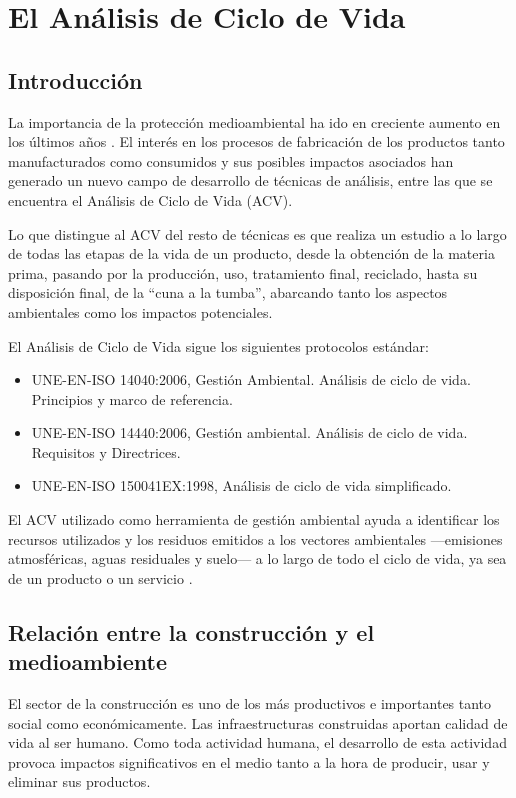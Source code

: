 \chapter{El Análisis de Ciclo de Vida}
\section{Introducción}
La importancia de la protección medioambiental ha ido en creciente aumento en los últimos años \cite{iso14040}. El interés en los procesos de fabricación de los productos tanto manufacturados como consumidos y sus posibles impactos asociados han generado un nuevo campo de desarrollo de técnicas de análisis, entre las que se encuentra el Análisis de Ciclo de Vida (ACV).

Lo que distingue al ACV del resto de técnicas es que realiza un estudio a lo largo de todas las etapas de la vida de un producto, desde la obtención de la materia prima, pasando por la producción, uso, tratamiento final, reciclado, hasta su disposición final, de la ``cuna a la tumba'', abarcando tanto los aspectos ambientales como los impactos potenciales.

El Análisis de Ciclo de Vida sigue los siguientes protocolos estándar:
\begin{itemize}
\item UNE-EN-ISO 14040:2006, Gestión Ambiental. Análisis de ciclo de vida. Principios y marco de referencia.
\item UNE-EN-ISO 14440:2006, Gestión ambiental. Análisis de ciclo de vida. Requisitos y Directrices.
\item UNE-EN-ISO 150041EX:1998, Análisis de ciclo de vida simplificado.
\end{itemize}

El ACV utilizado como herramienta de gestión ambiental ayuda a identificar los recursos utilizados y los residuos emitidos a los vectores ambientales —emisiones atmosféricas, aguas residuales y suelo— a lo largo de todo el ciclo de vida, ya sea de un producto o un servicio \cite{iso14440}.

\section{Relación entre la construcción y el medioambiente}
El sector de la construcción es uno de los más productivos e importantes tanto social como económicamente. Las infraestructuras construidas aportan calidad de vida al ser humano. Como toda actividad humana, el desarrollo de esta actividad provoca impactos significativos en el medio tanto a la hora de producir, usar y eliminar sus productos.

